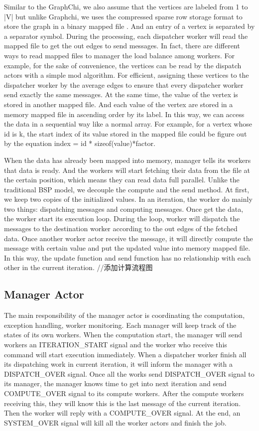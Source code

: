 \documentclass[twocolumn,a4paper,10pt]{article}
\begin{document}
Similar to the GraphChi, we also assume that the vertices are labeled from 1 to |V| but unlike Graphchi, we uses the compressed sparse row storage format to store the graph in a binary mapped file . And an entry of a vertex is separated by a separator symbol. During the processing, each dispatcher worker will read the mapped file to get the out edges to send messages. In fact, there are different ways to read mapped files to manager the load balance among workers. For example, for the sake of convenience, the vertices can be read by the dispatch actors with a simple mod algorithm. For efficient, assigning these vertices to the dispatcher worker by the average edges to ensure that every dispatcher worker send exactly the same messages. At the same time, the value of the vertex is stored in another mapped file. And each value of the vertex are stored in a memory mapped file in ascending order by its label. In this way, we can access the data in a sequential way like a normal array. For example, for a vertex whose id is k, the start index of its value stored in the mapped file could be figure out by the equation index = id * sizeof(value)*factor. 

 When the data has already been mapped into memory, manager tells its workers that data is ready. And the workers will start fetching their data from the file at the certain position, which means they can read data full parallel. Unlike the traditional BSP model, we decouple the compute and the send method. At first, we keep two copies of the initialized values. In an iteration, the worker do mainly two things: dispatching messages and computing messages. Once get the data, the worker start its execution loop. During the loop, worker will dispatch the messages to the destination worker according to the out edges of the fetched data. Once another worker actor receive the message, it will directly compute the message with certain value and put the updated value into memory mapped file. In this way, the update function and send function has no relationship with each other in the current iteration.
//添加计算流程图

\subsection{Manager Actor}
The main responsibility of the manager actor is coordinating the computation, exception handling, worker monitoring. Each manager will keep track of the states of its own workers. When the computation start, the manager will send workers an ITERATION\_START signal and the worker who receive this command will start execution immediately. When a dispatcher worker finish all its dispatching work in current iteration, it will inform the manager with a DISPATCH\_OVER signal. Once all the works send DISPATCH\_OVER signal to its manager, the manager knows time to get into next iteration and send COMPUTE\_OVER signal to its compute workers. After the compute workers receiving this, they will know this is the last message of the current iteration. Then the worker will reply with a COMPUTE\_OVER signal. At the end, an SYSTEM\_OVER signal will kill all the worker actors and finish the job.
\end{document}
